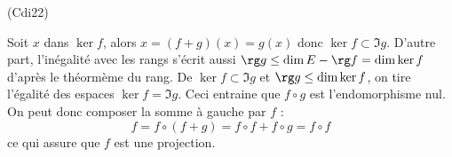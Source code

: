 \begin{tiny}(Cdi22)\end{tiny} Soit $x$ dans $\ker f$, alors $x= (f+g)(x)=g(x)$ donc $\ker f \subset \Im g$. D'autre part, l'inégalité avec les rangs s'écrit aussi $\rg g \leq \dim E - \rg f = \dim \ker f$ d'après le théormème du rang. De $\ker f \subset \Im g$ et $\rg g \leq \dim \ker f$, on tire l'égalité des espaces $\ker f =\Im g$. Ceci entraine que $f\circ g$ est l'endomorphisme nul. On peut donc composer la somme à gauche par $f$ :
\begin{displaymath}
 f=f\circ (f+g) = f\circ f + f\circ g = f\circ f
\end{displaymath}
ce qui assure que $f$ est une projection.
 